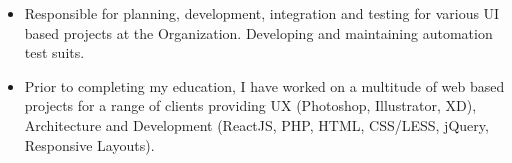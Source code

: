\documentclass[10pt,a4paper,ragged2e]{altacv}
\begin{document}

\begin{fullwidth}
\makecvheader
\end{fullwidth}



\begin{itemize}
\item Responsible for planning, development, integration and testing for various UI based projects at the Organization. Developing and maintaining automation test suits.

\end{itemize}

\divider

\begin{itemize}
\item  Prior to completing my education, I have worked on a multitude of web based projects for a range of clients providing UX (Photoshop, Illustrator, XD), Architecture and Development (ReactJS, PHP, HTML, CSS/LESS, jQuery, Responsive Layouts).

\end{itemize}
\end{document}

